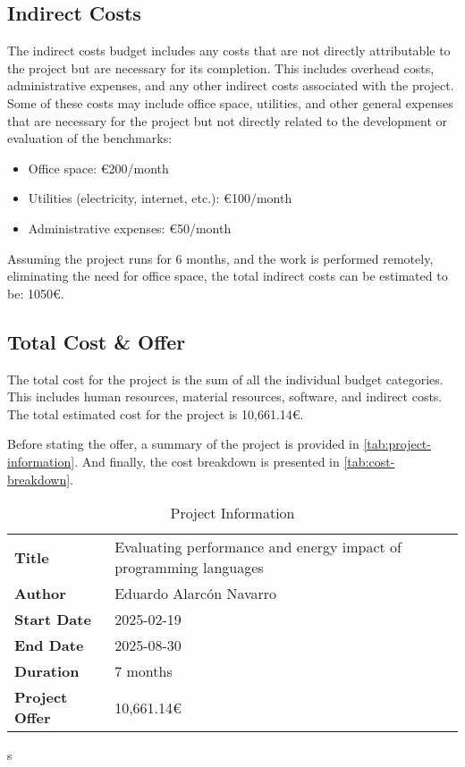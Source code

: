 \subsection{Indirect Costs}
The indirect costs budget includes any costs that are not directly attributable to the project but are necessary for its completion. This includes overhead costs, administrative expenses, and any other indirect costs associated with the project. 
Some of these costs may include office space, utilities, and other general expenses that are necessary for the project but not directly related to the development or evaluation of the benchmarks:
\begin{itemize}
    \item Office space: €200/month
    \item Utilities (electricity, internet, etc.): €100/month
    \item Administrative expenses: €50/month
\end{itemize}
Assuming the project runs for 6 months, and the work is performed remotely, eliminating the need for office space, the total indirect costs can be estimated to be: 1050€.

\subsection{Total Cost \& Offer}
The total cost for the project is the sum of all the individual budget categories. This includes human resources, material resources, software, and indirect costs. The total estimated cost for the project is 10,661.14€.

Before stating the offer, a summary of the project is provided in \autoref{tab:project-information}. And finally, the cost breakdown is presented in \autoref{tab:cost-breakdown}.

\begin{table}[h]
  \centering
  \begin{adjustbox}{max width=\textwidth}

  \begin{tabular}{|l|l|}
    \hline
    \textbf{Title}         & Evaluating performance and energy impact of programming languages \\ 
    \textbf{Author}        & Eduardo Alarcón Navarro \\ 
    \textbf{Start Date}    & 2025-02-19 \\ 
    \textbf{End Date}      & 2025-08-30 \\ 
    \textbf{Duration}      & 7 months \\ 
    \hline
    \textbf{Project Offer} & 10,661.14€      \\ 
    \hline
  \end{tabular}
  \end{adjustbox}

  \caption{Project Information}
  \label{tab:project-information}
\end{table}s


